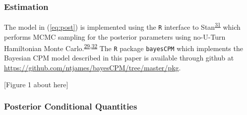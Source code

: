 \documentclass[
]{article}
\begin{document}
\hypertarget{estimation}{%
\subsubsection{Estimation}\label{estimation}}

The model in (\ref{eq:post}) is implemented using the \texttt{R} interface to Stan\textsuperscript{\protect\hyperlink{ref-stan_development_team_rstan:_2018}{31}} which performs MCMC sampling for the posterior parameters using no-U-Turn Hamiltonian Monte Carlo.\textsuperscript{\protect\hyperlink{ref-gelman_bayesian_2014}{29},\protect\hyperlink{ref-neal_mcmc_2011}{32}} The \texttt{R} package \texttt{bayesCPM} which implements the Bayesian CPM model described in this paper is available through github at \url{https://github.com/ntjames/bayesCPM/tree/master/pkg}.

{[}Figure 1 about here{]}

\hypertarget{posterior-conditional-quantities}{%
\subsubsection{Posterior Conditional Quantities}\label{posterior-conditional-quantities}}
\end{document}
